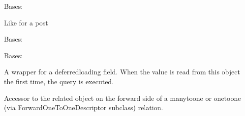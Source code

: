 \documentclass[letterpaper,10pt,english]{sphinxmanual}
\begin{document}
\begin{fulllineitems}
\label{\detokenize{forums:forums.models.LikePost}}
Bases: {\hyperref[\detokenize{forums:forums.models.AbstractLike}]{}}

Like for a post

\begin{fulllineitems}
\label{\detokenize{forums:forums.models.LikePost.DoesNotExist}}
Bases: 

\end{fulllineitems}


\begin{fulllineitems}
\label{\detokenize{forums:forums.models.LikePost.MultipleObjectsReturned}}
Bases: 

\end{fulllineitems}


\begin{fulllineitems}
\label{\detokenize{forums:forums.models.LikePost.id}}
A wrapper for a deferred\sphinxhyphen{}loading field. When the value is read from this
object the first time, the query is executed.

\end{fulllineitems}


\begin{fulllineitems}
\label{\detokenize{forums:forums.models.LikePost.liker}}
Accessor to the related object on the forward side of a many\sphinxhyphen{}to\sphinxhyphen{}one or
one\sphinxhyphen{}to\sphinxhyphen{}one (via ForwardOneToOneDescriptor subclass) relation.


\end{fulllineitems}
\end{fulllineitems}
\end{document}
